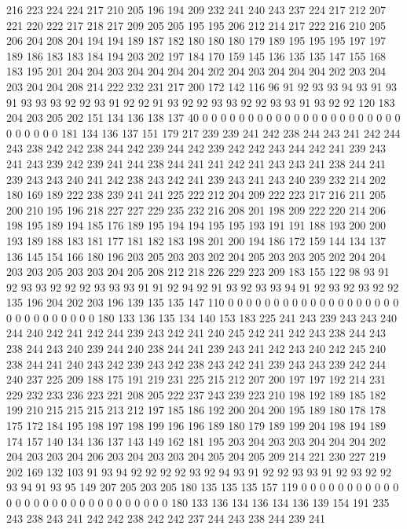 216 223 224 224 217 210 205 196 194 209 232 241 240 243 237 224 217 212 207 221
220 222 217 218 217 209 205 205 195 195 206 212 214 217 222 216 210 205 206 204
208 204 194 194 189 187 182 180 180 180 179 189 195 195 195 197 197 189 186 183
183 184 194 203 202 197 184 170 159 145 136 135 135 147 155 168 183 195 201 204
204 203 204 204 204 204 202 204 203 204 204 204 202 203 204 203 204 204 208 214
222 232 231 217 200 172 142 116 96 91 92 93 93 94 93 91 93 91 93 93
93 92 92 93 91 92 92 91 93 92 92 93 93 92 92 93 93 91 93 92
92 120 183 204 203 205 202 151 134 136 138 137 40 0 0 0 0 0 0 0
0 0 0 0 0 0 0 0 0 0 0 0 0 0 0 0 0 0 0 0
0 181 134 136 137 151 179 217 239 239 241 242 238 244 243 241 242 244 243 238
242 242 238 244 242 239 244 242 239 242 242 243 244 242 241 239 243 241 243 239
242 239 241 244 238 244 241 241 242 241 243 243 241 238 244 241 239 243 243 240
241 242 238 243 242 241 239 243 241 243 240 239 232 214 202 180 169 189 222 238
239 241 241 225 222 212 204 209 222 223 217 216 211 205 200 210 195 196 218 227
227 229 235 232 216 208 201 198 209 222 220 214 206 198 195 189 194 185 176 189
195 194 194 195 195 193 191 191 188 193 200 200 193 189 188 183 181 177 181 182
183 198 201 200 194 186 172 159 144 134 137 136 145 154 166 180 196 203 205 203
203 202 204 205 203 203 205 202 204 204 203 203 205 203 203 204 205 208 212 218
226 229 223 209 183 155 122 98 93 91 92 93 93 92 92 92 93 93 93 91
91 92 94 92 91 93 92 93 93 94 91 92 93 92 93 92 92 135 196 204
202 203 196 139 135 135 147 110 0 0 0 0 0 0 0 0 0 0 0 0
0 0 0 0 0 0 0 0 0 0 0 0 0 0 0 0 0 180 133 136
135 134 140 153 183 225 241 243 239 243 243 240 244 240 242 241 242 244 239 243
242 241 240 245 242 241 242 243 238 244 243 238 244 243 240 239 244 240 238 244
241 239 243 241 242 243 240 242 245 240 238 244 241 240 243 242 239 243 242 238
243 242 241 239 243 243 239 242 244 240 237 225 209 188 175 191 219 231 225 215
212 207 200 197 197 192 214 231 229 232 233 236 223 221 208 205 222 237 243 239
223 210 198 192 189 185 182 199 210 215 215 215 213 212 197 185 186 192 200 204
200 195 189 180 178 178 175 172 184 195 198 197 198 199 196 196 189 180 179 189
199 204 198 194 189 174 157 140 134 136 137 143 149 162 181 195 203 204 203 203
204 204 204 202 204 203 203 204 206 203 204 203 203 204 205 204 205 209 214 221
230 227 219 202 169 132 103 91 93 94 92 92 92 92 93 92 94 93 91 92
92 93 93 91 92 93 92 92 93 94 91 93 95 149 207 205 203 205 180 135
135 135 157 119 0 0 0 0 0 0 0 0 0 0 0 0 0 0 0 0
0 0 0 0 0 0 0 0 0 0 0 0 0 180 133 136 134 136 134 136
139 154 191 235 243 238 243 241 242 242 238 242 242 237 244 243 238 244 239 241
